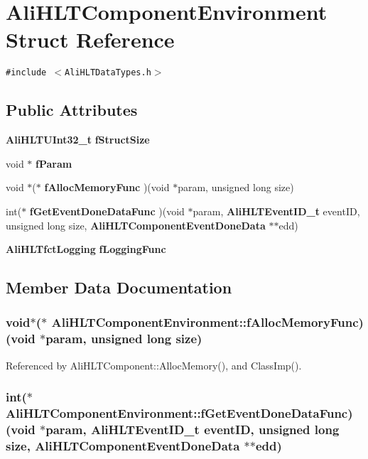 \section{Ali\-HLTComponent\-Environment Struct Reference}
\label{structAliHLTComponentEnvironment}
{\tt \#include $<$Ali\-HLTData\-Types.h$>$}

\subsection*{Public Attributes}
\begin{CompactItemize}
\item 
{\bf Ali\-HLTUInt32\_\-t} {\bf f\-Struct\-Size}
\item 
void $\ast$ {\bf f\-Param}
\item 
void $\ast$($\ast$ {\bf f\-Alloc\-Memory\-Func} )(void $\ast$param, unsigned long size)
\item 
int($\ast$ {\bf f\-Get\-Event\-Done\-Data\-Func} )(void $\ast$param, {\bf Ali\-HLTEvent\-ID\_\-t} event\-ID, unsigned long size, {\bf Ali\-HLTComponent\-Event\-Done\-Data} $\ast$$\ast$edd)
\item 
{\bf Ali\-HLTfct\-Logging} {\bf f\-Logging\-Func}
\end{CompactItemize}


\subsection{Member Data Documentation}
\subsubsection{\setlength{\rightskip}{0pt plus 5cm}void$\ast$($\ast$ {\bf Ali\-HLTComponent\-Environment::f\-Alloc\-Memory\-Func})(void $\ast$param, unsigned long size)}\label{structAliHLTComponentEnvironment_o2}




Referenced by Ali\-HLTComponent::Alloc\-Memory(), and Class\-Imp().
\subsubsection{\setlength{\rightskip}{0pt plus 5cm}int($\ast$ {\bf Ali\-HLTComponent\-Environment::f\-Get\-Event\-Done\-Data\-Func})(void $\ast$param, {\bf Ali\-HLTEvent\-ID\_\-t} event\-ID, unsigned long size, {\bf Ali\-HLTComponent\-Event\-Done\-Data} $\ast$$\ast$edd)}\label{structAliHLTComponentEnvironment_o3}




